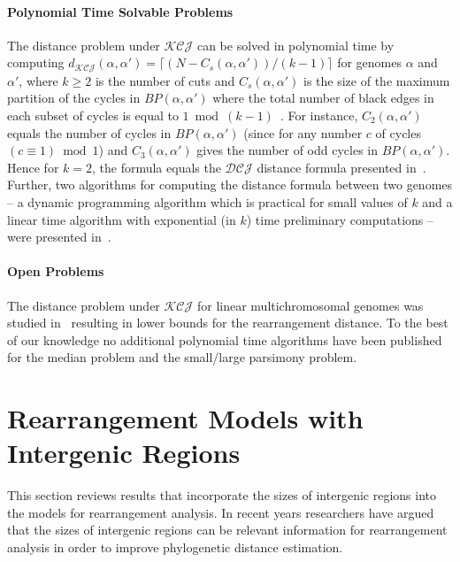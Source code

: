 \documentclass{svmult}
\newcommand{\m}[1]{\mathcal{#1}}
\begin{document}
\paragraph{Polynomial Time Solvable Problems}

The distance problem under $\m{KCJ}$ can be solved in polynomial time 
by computing
$d_{\m{KCJ}}(\alpha,\alpha')=\lceil(N-C_s(\alpha,\alpha'))/(k-1)\rceil$ for
genomes $\alpha$ and $\alpha'$, where $k\geq 2$ is the number of cuts and
$C_s(\alpha,\alpha')$ is the size of the maximum partition of the cycles in
$BP(\alpha,\alpha')$ where the total number of black edges in each subset of
cycles is equal to $1 \bmod{(k-1)}$~\cite{Alekseyev_2008}.
For instance, $C_2(\alpha,\alpha')$ equals the number of cycles in $BP(\alpha,\alpha')$ (since
for any number $c$ of cycles $(c\equiv 1)\bmod{1}$) and $C_3(\alpha,\alpha')$
gives the number of odd cycles in $BP(\alpha,\alpha')$.
Hence for $k=2$, the formula equals the $\m{DCJ}$ distance formula presented in~\cite{Yancopoulos_2005}. 
Further, two algorithms for computing the distance formula between two genomes -- a dynamic programming algorithm 
which is practical for small values of
$k$ and a linear time algorithm with exponential (in
$k$) time preliminary computations -- were presented in~\cite{Alekseyev_2008}.


\paragraph{Open Problems}
The distance problem under $\m{KCJ}$ for linear multichromosomal
genomes was studied in~\cite{Alekseyev_2008b} resulting in lower bounds for the
rearrangement distance. To the best of our knowledge no additional polynomial time algorithms have been published for 
the median problem and the small/large parsimony problem.


\section{Rearrangement Models with Intergenic Regions}


This section reviews results that incorporate the sizes of intergenic regions
into the models for rearrangement analysis. In recent years researchers have
argued that the sizes of intergenic regions can be relevant information for
rearrangement analysis in order to improve phylogenetic distance estimation.
\end{document}

